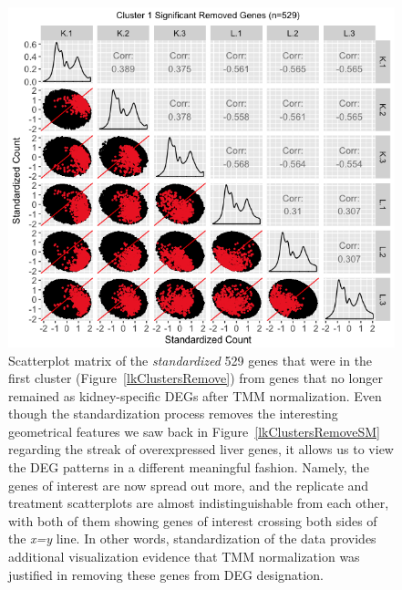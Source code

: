 \documentclass[11pt,a4paper,oldfontcommands,openany]{memoir}
\numberwithin{equation}{section} %
\begin{document}
\null
\begin{figure}[t!]
\begin{framed}
\centerline{\includegraphics[width=1\columnwidth]{MakeFigures/lkClustersRemoveSM-St.jpg}}
\end{framed}
\caption{Scatterplot matrix of the \textit{standardized} 529 genes that were in the first cluster (Figure~\ref{lkClustersRemove}) from genes that no longer remained as kidney-specific DEGs after TMM normalization. Even though the standardization process removes the interesting geometrical features we saw back in Figure~\ref{lkClustersRemoveSM} regarding the streak of overexpressed liver genes, it allows us to view the DEG patterns in a different meaningful fashion. Namely, the genes of interest are now spread out more, and the replicate and treatment scatterplots are almost indistinguishable from each other, with both of them showing genes of interest crossing both sides of the \textit{x=y} line. In other words, standardization of the data provides additional visualization evidence that TMM normalization was justified in removing these genes from DEG designation. 
\label{lkClustersRemoveSM-St}}
\end{figure}
\end{document}
